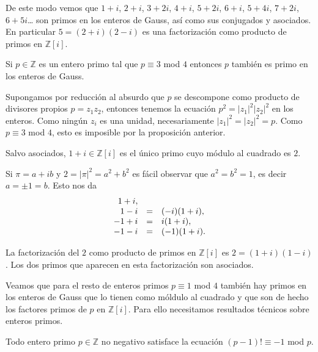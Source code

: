 De este modo vemos que \(1+i\), \(2+i\), \(3+2i\), \(4+i\), \(5+2i\),
\(6+i\), \(5+4i\), \(7+2i\), \(6+5i\)\ldots{} son primos en los enteros
de Gauss, así como sus conjugados y asociados. En particular
\(5=(2+i)(2-i)\) es una factorización como producto de primos en
\(\mathbb Z[i]\).


Si \(p\in\mathbb Z\) es un entero primo tal que \(p\equiv 3\) mod \(4\)
entonces \(p\) también es primo en los enteros de Gauss.


Supongamos por reducción al absurdo que \(p\) se descompone como
producto de divisores propios \(p=z_1z_2\), entonces tenemos la ecuación
\(p^2=|z_1|^2|z_2|^2\) en los enteros. Como ningún \(z_i\) es una
unidad, necesariamente \(|z_1|^2=|z_2|^2=p\). Como \(p\equiv 3\) mod
\(4\), esto es imposible por la proposición anterior. 


Salvo asociados, \(1+i\in\mathbb Z[i]\) es el único primo cuyo módulo al
cuadrado es \(2\). 


Si \(\pi=a+ib\) y \(2=|\pi|^2=a^2+b^2\) es fácil observar que
\(a^2=b^2=1\), es decir \(a=\pm1=b\). Esto nos da \[\begin{array}{rcl}
1+i,&&\cr
1-i&=&(-i)(1+i),\cr
-1+i&=&i(1+i),\cr
-1-i&=&(-1)(1+i).
\end{array}\] 


La factorización del \(2\) como producto de primos en \(\mathbb Z[i]\)
es \(2=(1+i)(1-i)\). Los dos primos que aparecen en esta factorización
son asociados. 

Veamos que para el resto de enteros primos \(p\equiv 1\) mod \(4\)
también hay primos en los enteros de Gauss que lo tienen como móldulo al
cuadrado y que son de hecho los factores primos de \(p\) en
\(\mathbb Z[i]\). Para ello necesitamos resultados técnicos sobre
enteros primos.


Todo entero primo \(p\in\mathbb Z\) no negativo satisface la ecuación
\((p-1)!\equiv -1\) mod \(p\). 


